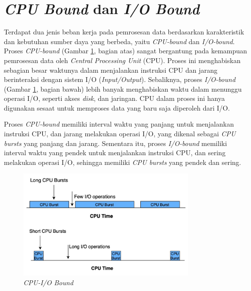 \section{\textit{CPU Bound} dan \textit{I/O Bound}}

Terdapat dua jenis beban kerja pada pemrosesan data berdasarkan karakteristik dan kebutuhan sumber daya yang berbeda, yaitu \textit{CPU-bound} dan \textit{I/O-bound}. Proses \textit{CPU-bound} (Gambar \ref{fig:cpu-bound}, bagian atas) sangat bergantung pada kemampuan pemrosesan data oleh \textit{Central Processing Unit} (CPU). Proses ini menghabiskan sebagian besar waktunya dalam menjalankan instruksi CPU dan jarang berinteraksi dengan sistem I/O (\textit{Input/Output}). Sebaliknya, proses \textit{I/O-bound} (Gambar \ref{fig:cpu-bound}, bagian bawah) lebih banyak menghabiskan waktu dalam menunggu operasi I/O, seperti akses \textit{disk}, dan jaringan. CPU dalam proses ini hanya digunakan sesaat untuk memproses data yang baru saja diperoleh dari I/O. 

Proses \textit{CPU-bound} memiliki interval waktu yang panjang untuk menjalankan instruksi CPU, dan jarang melakukan operasi I/O, yang dikenal sebagai \textit{CPU bursts} yang panjang dan jarang. Sementara itu, proses \textit{I/O-bound} memiliki interval waktu yang pendek untuk menjalankan instruksi CPU, dan sering melakukan operasi I/O, sehingga memiliki \textit{CPU bursts} yang pendek dan sering. 

\begin{figure}[h!]
    \centering
    \includegraphics[width=0.8\textwidth]{figures/ch02/cpu-io-bound.jpg}
    \caption{\textit{CPU-I/O Bound} \cite{baeldungGuideCpuBoundBound2021}}
    \label{fig:cpu-bound}
\end{figure}



